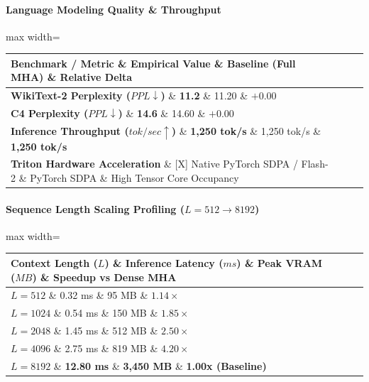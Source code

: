 \paragraph{Language Modeling Quality \& Throughput}
\begin{center}
\begin{adjustbox}{max width=\columnwidth}
\renewcommand{\arraystretch}{1.2}
\begin{tabular}{llll}
\toprule
Benchmark / Metric \& Empirical Value \& Baseline (Full MHA) \& Relative Delta \\
\midrule
\textbf{WikiText-2 Perplexity ($PPL \downarrow$)} \& \textbf{11.2} \& 11.20 \& $+0.00$ \\
\textbf{C4 Perplexity ($PPL \downarrow$)} \& \textbf{14.6} \& 14.60 \& $+0.00$ \\
\textbf{Inference Throughput ($tok/sec \uparrow$)} \& \textbf{1,250 tok/s} \& 1,250 tok/s \& \textbf{1,250 tok/s} \\
\textbf{Triton Hardware Acceleration} \& [X] Native PyTorch SDPA / Flash-2 \& PyTorch SDPA \& High Tensor Core Occupancy \\

\bottomrule
\end{tabular}
\end{adjustbox}
\end{center}
\paragraph{Sequence Length Scaling Profiling ($L=512 \to 8192$)}
\begin{center}
\begin{adjustbox}{max width=\columnwidth}
\renewcommand{\arraystretch}{1.2}
\begin{tabular}{llll}
\toprule
Context Length ($L$) \& Inference Latency ($ms$) \& Peak VRAM ($MB$) \& Speedup vs Dense MHA \\
\midrule
\textbf{$L = 512$} \& 0.32 ms \& 95 MB \& $1.14\times$ \\
\textbf{$L = 1024$} \& 0.54 ms \& 150 MB \& $1.85\times$ \\
\textbf{$L = 2048$} \& 1.45 ms \& 512 MB \& $2.50\times$ \\
\textbf{$L = 4096$} \& 2.75 ms \& 819 MB \& $4.20\times$ \\
\textbf{$L = 8192$} \& \textbf{12.80 ms} \& \textbf{3,450 MB} \& \textbf{1.00x (Baseline)} \\


\bottomrule
\end{tabular}
\end{adjustbox}
\end{center}

